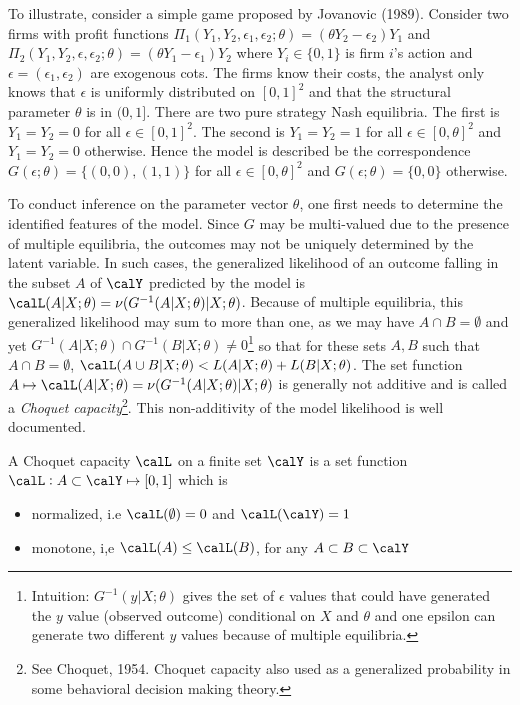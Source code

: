 \begin{example}
	\label{ex:GH-1}
	To illustrate, consider a simple game proposed by Jovanovic (1989). Consider two firms with profit functions $\Pi_1(Y_1, Y_2, \epsilon_1, \epsilon_2;\theta)= (\theta Y_2 - \epsilon_2)Y_1$ and $\Pi_2(Y_1, Y_2, \epsilon, \epsilon_2; \theta) = (\theta Y_1 - \epsilon_1)Y_2$ where $Y_i \in \{0,1\}$ is firm $i$'s action and $\epsilon = (\epsilon_1, \epsilon_2)$ are exogenous cots. The firms know their costs, the analyst only knows that $\epsilon$ is uniformly distributed on $[0,1]^2$ and that the structural parameter $\theta$ is in $(0,1]$. There are two pure strategy Nash equilibria. The first is $Y_1 = Y_2 = 0$ for all $\epsilon \in [0,1]^2$.  The second is $Y_1 = Y_2 = 1$ for all $\epsilon \in [0,\theta]^2$ and $Y_1 = Y_2 = 0$ otherwise. Hence the model is described be the correspondence $G(\epsilon; \theta) = \{(0,0),(1,1)\}$ for all $\epsilon \in [0,\theta]^2$ and $G(\epsilon;\theta) = \{0,0\}$ otherwise.
\end{example}

To conduct inference on the parameter vector $\theta$, one first needs to determine the identified features of the model. Since $G$ may be multi-valued due to the presence of multiple equilibria, the outcomes may not be uniquely determined by the latent variable. In such cases, the generalized likelihood of an outcome falling in the subset $A$ of $\calY$ predicted by the model is $\calL(A|X;\theta) = \nu(G^{-1}(A|X;\theta)|X;\theta)$. Because of multiple equilibria, this generalized likelihood may sum to more than one, as we may have $A\cap B = \emptyset$ and yet $G^{-1}(A | X;\theta) \cap G^{-1}(B|X;\theta) \neq 0$\footnote{Intuition: $G^{-1}(y|X;\theta)$ gives the set of $\epsilon$ values that could have generated the $y$ value (observed outcome) conditional on $X$ and $\theta$ and one epsilon can generate two different $y$ values because of multiple equilibria.} so that for these sets $A,B$ such that $A \cap B = \emptyset$, $\calL(A\cup B | X;\theta) < L(A|X;\theta) + L(B|X;\theta)$. The set function $A\mapsto \calL(A|X;\theta) = \nu(G^{-1}(A|X;\theta)|X;\theta)$ is generally not additive and is called a \textit{Choquet capacity}\footnote{See Choquet, 1954. Choquet capacity also used as a generalized probability in some behavioral decision making theory.}. This non-additivity of the model likelihood is well documented.

\begin{definition}
	\label{def:GH-1}
	A Choquet capacity $\calL$ on a finite set $\calY$ is a set function $\calL: A\subset\calY\mapsto[0,1]$ which is
	\begin{itemize}
		\item normalized, i.e $\calL(\emptyset) = 0$ and $\calL(\calY) = 1$
		\item monotone, i,e $\calL(A) \leq \calL(B)$, for any $A\subset B\subset \calY$
	\end{itemize}
\end{definition}

